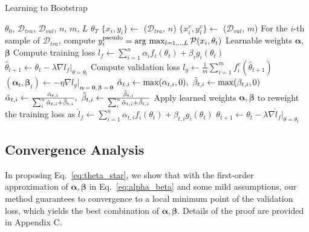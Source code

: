 \documentclass{article}
\newcommand{\argmax}{\arg\,\max}
\begin{document}
\begin{algorithm}[t!]
\caption{Learning to Bootstrap}
\label{alg:L2B}
\begin{algorithmic}[1]
\REQUIRE $\theta_0$, $\mathcal{D}_{tra}$, $\mathcal{D}_{val}$, $n$, $m$, $L$
\ENSURE $\theta_T$
\STATE $\{x_i, y_i\} \gets$ ($\mathcal{D}_{tra}$, $n$)
\STATE $\{x_i^v, y_i^v\} \gets$ ($\mathcal{D}_{val}$, $m$)
\STATE For the $i$-th sample of $\mathcal{D}_{tra}$, compute $y^\textup{pseudo}_i = \argmax_{l=1,..,L} \mathcal{P} (x_i,\theta_t)$ 
\STATE Learnable weights $\boldsymbol{\alpha}$, $\boldsymbol{\beta}$
\STATE Compute training loss $l_f \gets \sum_{i=1}^n \alpha_i f_i(\theta_t) + \beta_i g_i(\theta_t)$
\STATE $\hat{\theta}_{t + 1} \gets \theta_t - \lambda \nabla l_f\Big |_{\theta=\theta_t}$
\STATE Compute validation loss $l_g \gets \frac{1}{m} \sum_{i=1}^m f^v_i(\hat{\theta}_{t + 1})$
\STATE $(\boldsymbol{\alpha}_{t},\boldsymbol{\beta}_{t})\gets-\eta\nabla l_g \Big |_{\boldsymbol{\alpha}=\boldsymbol{0},\boldsymbol{\beta}=\boldsymbol{0}}$
\STATE $\Tilde{\alpha}_{t,i}\gets\text{max}(\alpha_{t,i},0),\ \Tilde{\beta}_{t,i}\gets\text{max}(\beta_{t,i},0)$
\STATE $\Tilde{\alpha}_{t,i}\gets\frac{\Tilde{\alpha}_{t,i}}{\sum_i^n \Tilde{\alpha}_{t,i}+\Tilde{\beta}_{t,i}},\ \Tilde{\beta}_{t,i}\gets\frac{\Tilde{\beta}_{t,i}}{\sum_i^n \Tilde{\alpha}_{t,i}+\Tilde{\beta}_{t,i}}$
\STATE Apply learned weights $\boldsymbol{\alpha}, \boldsymbol{\beta}$ to reweight the training loss as $\hat{l}_f \gets \sum_{i=1}^n \alpha_{t,i} f_i(\theta_t) + \beta_{t,i} g_i(\theta_t)$
\STATE  $\theta_{t + 1} \gets \theta_t - \lambda \nabla \hat{l}_f\Big |_{\theta=\theta_t}$
\ENDFOR
\end{algorithmic}
\end{algorithm}


\subsection{Convergence Analysis} 
In proposing Eq.~\eqref{eq:theta_star}, we show that with the first-order approximation of $\boldsymbol{\alpha}, \boldsymbol{\beta}$ in Eq.~\eqref{eq:alpha_beta} and some mild assumptions, our method guarantees to convergence to a local minimum point of the validation loss, which yields the best combination of $\boldsymbol{\alpha}, \boldsymbol{\beta}$. 
Details of the proof are provided in Appendix C. 
\end{document}
